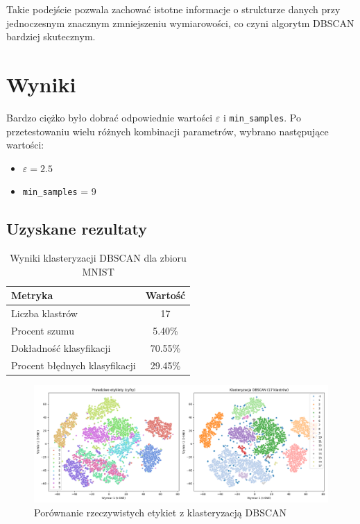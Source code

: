 \documentclass[12pt,a4paper]{article}
\begin{document}
\noindent Takie podejście pozwala zachować istotne informacje o strukturze danych przy jednoczesnym znacznym zmniejszeniu wymiarowości, co czyni algorytm DBSCAN bardziej skutecznym.

\section{Wyniki}

Bardzo ciężko było dobrać odpowiednie wartości $\varepsilon$ i \texttt{min\_samples}.
Po przetestowaniu wielu różnych kombinacji parametrów, wybrano następujące wartości:
\begin{itemize}
\item $\varepsilon = 2.5$
\item \texttt{min\_samples} = 9
\end{itemize}
\subsection{Uzyskane rezultaty}
\begin{table}[H]
\centering
\begin{tabular}{|l|c|}
\hline
\textbf{Metryka} & \textbf{Wartość} \\
\hline
Liczba klastrów & 17 \\
\hline
Procent szumu & 5.40\% \\
\hline
Dokładność klasyfikacji & 70.55\% \\
\hline
Procent błędnych klasyfikacji & 29.45\% \\
\hline
\end{tabular}
\caption{Wyniki klasteryzacji DBSCAN dla zbioru MNIST}
\end{table}

\begin{figure}[H]
\centering
\includegraphics[width=1.0\textwidth]{img/dbscan_porownanie.png}
\caption{Porównanie rzeczywistych etykiet z klasteryzacją DBSCAN}
\end{figure}
\end{document}

